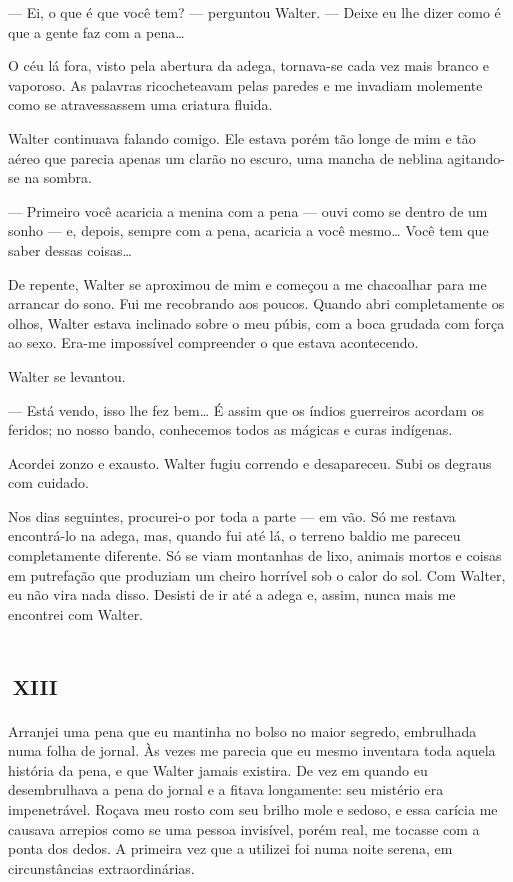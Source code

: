 --- Ei, o que é que você tem? --- perguntou Walter. --- Deixe eu lhe dizer como é que a gente faz com a pena\ldots{}

O céu lá fora, visto pela abertura da adega, tornava-se cada vez mais branco e vaporoso. As palavras ricocheteavam pelas paredes e me invadiam molemente como se atravessassem uma criatura fluida.

Walter continuava falando comigo. Ele estava porém tão longe de mim e tão aéreo que parecia apenas um clarão no escuro, uma mancha de neblina agitando-se na sombra.

--- Primeiro você acaricia a menina com a pena --- ouvi como se dentro de um sonho --- e, depois, sempre com a pena, acaricia a você mesmo\ldots{} Você tem que saber dessas coisas\ldots{}

De repente, Walter se aproximou de mim e começou a me chacoalhar para me arrancar do sono. Fui me recobrando aos poucos. Quando abri completamente os olhos, Walter estava inclinado sobre o meu púbis, com a boca grudada com força ao sexo. Era-me impossível compreender o que estava acontecendo.

Walter se levantou.

--- Está vendo, isso lhe fez bem\ldots{} É assim que os índios guerreiros acordam os feridos; no nosso bando, conhecemos todos as mágicas e curas indígenas.

Acordei zonzo e exausto. Walter fugiu correndo e desapareceu. Subi os degraus com cuidado.

Nos dias seguintes, procurei-o por toda a parte --- em vão. Só me restava encontrá-lo na adega, mas, quando fui até lá, o terreno baldio me pareceu completamente diferente. Só se viam montanhas de lixo, animais mortos e coisas em putrefação que produziam um cheiro horrível sob o calor do sol. Com Walter, eu não vira nada disso. Desisti de ir até a adega e, assim, nunca mais me encontrei com Walter.


\chapter*{\small{}\,\Large\centering\textsc{xiii}\,\small{}}

Arranjei uma pena que eu mantinha no bolso no maior segredo, embrulhada numa folha de jornal. Às vezes me parecia que eu mesmo inventara toda aquela história da pena, e que Walter jamais existira. De vez em quando eu desembrulhava a pena do jornal e a fitava longamente: seu mistério era impenetrável. Roçava meu rosto com seu brilho mole e sedoso, e essa carícia me causava arrepios como se uma pessoa invisível, porém real, me tocasse com a ponta dos dedos. A primeira vez que a utilizei foi numa noite serena, em circunstâncias extraordinárias.

